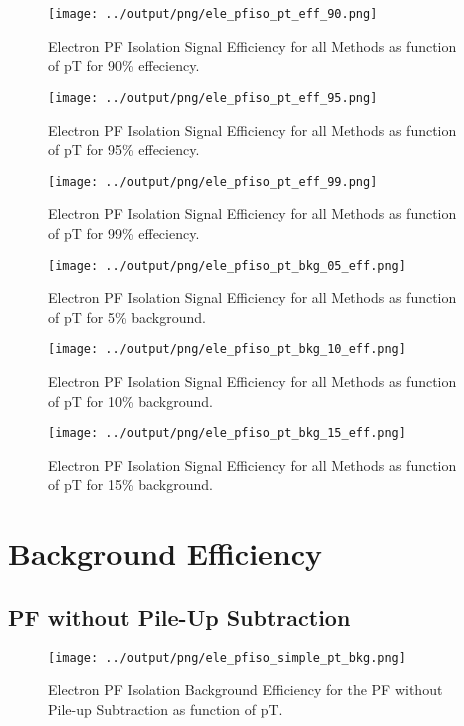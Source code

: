 \documentclass[11pt]{book}
\begin{document}
\begin{figure}[htb]
\centering
\texttt{[image: ../output/png/ele\_pfiso\_pt\_eff\_90.png]}
\caption{Electron PF Isolation Signal Efficiency for all Methods as function of pT for 90\% effeciency.}
\label{fig:ele_pfiso_pt_eff_90}
\end{figure}

\begin{figure}[htb]
\centering
\texttt{[image: ../output/png/ele\_pfiso\_pt\_eff\_95.png]}
\caption{Electron PF Isolation Signal Efficiency for all Methods as function of pT for 95\% effeciency.}
\label{fig:ele_pfiso_pt_eff_95}
\end{figure}

\begin{figure}[htb]
\centering
\texttt{[image: ../output/png/ele\_pfiso\_pt\_eff\_99.png]}
\caption{Electron PF Isolation Signal Efficiency for all Methods as function of pT for 99\% effeciency.}
\label{fig:ele_pfiso_pt_eff_99}
\end{figure}

\begin{figure}[htb]
\centering
\texttt{[image: ../output/png/ele\_pfiso\_pt\_bkg\_05\_eff.png]}
\caption{Electron PF Isolation Signal Efficiency for all Methods as function of pT for 5\% background.}
\label{fig:ele_pfiso_pt_bkg_05_eff}
\end{figure}

\begin{figure}[htb]
\centering
\texttt{[image: ../output/png/ele\_pfiso\_pt\_bkg\_10\_eff.png]}
\caption{Electron PF Isolation Signal Efficiency for all Methods as function of pT for 10\% background.}
\label{fig:ele_pfiso_pt_bkg_10_eff}
\end{figure}

\begin{figure}[htb]
\centering
\texttt{[image: ../output/png/ele\_pfiso\_pt\_bkg\_15\_eff.png]}
\caption{Electron PF Isolation Signal Efficiency for all Methods as function of pT for 15\% background.}
\label{fig:ele_pfiso_pt_bkg_15_eff}
\end{figure}
\clearpage

\section{Background Efficiency}
\subsection{PF without Pile-Up Subtraction}
\begin{figure}[htb]
\centering
\texttt{[image: ../output/png/ele\_pfiso\_simple\_pt\_bkg.png]}
\caption{Electron PF Isolation Background Efficiency for the PF without Pile-up Subtraction as function of pT.}
\label{fig:ele_pfiso_pt_bkg_simple}
\end{figure}
\end{document}
